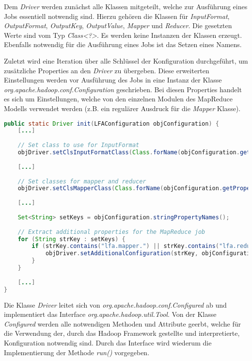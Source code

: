 Dem \textit{Driver} werden zunächst alle Klassen mitgeteilt, welche zur Ausführung eines Jobs essentiell notwendig sind. Hierzu gehören die Klassen für \textit{InputFormat}, \textit{OutputFormat}, \textit{OutputKey}, \textit{OutputValue}, \textit{Mapper} und \textit{Reducer}. Die gesetzten Werte sind vom Typ \textit{Class<?>}. Es werden keine Instanzen der Klassen erzeugt. Ebenfalls notwendig für die Ausführung eines Jobs ist das Setzen eines Namens.

\newpage
Zuletzt wird eine Iteration über alle Schlüssel der Konfiguration durchgeführt, um zusätzliche Properties an den \textit{Driver} zu übergeben. Diese erweiterten Einstellungen werden vor Ausführung des Jobs in eine Instanz der Klasse \textit{org.apache.hadoop.conf.Configuration} geschrieben. Bei diesen Properties handelt es sich um Einstellungen, welche von den einzelnen Modulen des MapReduce Modells verwendet werden (z.B. ein regulärer Ausdruck für die \textit{Mapper} Klasse).\\

\begin{lstlisting}[language=Java,caption=Auszug der Methode \textit{Bootstrap:init()},label=lst:BootstrapInit]
public static Driver init(LFAConfiguration objConfiguration) {
	[...]
	
	// Set class to use for InputFormat
	objDriver.setClsInputFormatClass(Class.forName(objConfiguration.getProperty("lfa.driver.input.format")));
	
	[...]
	
	// Set classes for mapper and reducer
	objDriver.setClsMapperClass(Class.forName(objConfiguration.getProperty("lfa.driver.mapper")));
	
	[...]
	
	Set<String> setKeys = objConfiguration.stringPropertyNames();
	
	// Extract additional properties for the MapReduce job
	for (String strKey : setKeys) {
		if (strKey.contains("lfa.mapper.") || strKey.contains("lfa.reducer.") || strKey.contains("lfa.driver.add.")) {
			objDriver.setAdditionalConfiguration(strKey, objConfiguration.getProperty(strKey));
		}
	}
	
	[...]
}
\end{lstlisting}

Die Klasse \textit{Driver} leitet sich von \textit{org.apache.hadoop.conf.Configured} ab und implementiert das Interface \textit{org.apache.hadoop.util.Tool}. Von der Klasse \textit{Configured} werden alle notwendigen Methoden und Attribute geerbt, welche für die Verwendung der, durch das Hadoop Framework gestellte und interpretierte, Konfiguration notwendig sind. Durch das Interface wird wiederum die Implementierung der Methode \textit{run()} vorgegeben.

